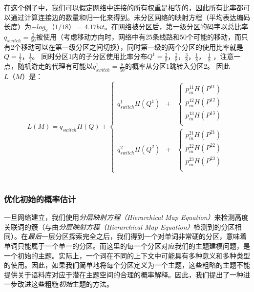在这个例子中，我们可以假定网络中连接的所有权重是相等的，因此所有比率都可以通过计算连接边的数量和归一化来得到。未分区网络的映射方程（平均表达编码长度）为$ - log_2（1/18）= 4.17 bit$。在网络被分区后，第一级分区的码字以总比率$ q_ {switch} = \frac {2} {50} $被使用（考虑移动方向时，网络中有25条线路和50个可能的移动，而只有2个移动可以在第一级分区之间切换），同时第一级的两个分区的使用比率就是$ Q = \frac {1} {2}，\frac {1} {2} $。 同时分区1内的子分区使用比率分布$ Q ^ 1 = \frac {2} {8}，\frac {2} {8}，\frac {3} {8}，\frac {1} {8} $， $ \frac {1} {8} $ ，注意一点，随机游走的代理有可能以$ q_ {switch} ^ 1 = \frac {8} {50} $的概率从分区1跳转入分区2。 因此$ L（M）$是：\\
\begin{equation}
L(M) = q_{switch}H(Q) + \left\{
\begin{aligned}
q_{switch}^1H(Q^1) & + & \left\{
\begin{aligned}
p_{in}^{11}H(P^{11}) \\
p_{in}^{12}H(P^{12}) \\
p_{in}^{13}H(P^{13}) \\
\end{aligned}
\right.\\
q_{switch}^2H(Q^2) & + & \left\{
\begin{aligned}
p_{in}^{21}H(P^{21}) \\
p_{in}^{22}H(P^{22}) \\
p_{in}^{23}H(P^{23}) \\
\end{aligned}
\right.
\end{aligned}
\right.
\end{equation}\\
\subsubsection{优化初始的概率估计}
一旦网络建立，我们使用\emph{分层映射方程（Hierarchical Map Equation）}来检测高度关联词的簇（与由\emph{分层映射方程（Hierarchical Map Equation）}检测到的分区相同）。在\emph{最后}一层分区探索完全之后，我们得到一个对单词非常硬的分区，意味着单词只能属于一个单一的分区。而这里的每一个分区对应我们的主题建模问题，是一个初始的主题。实际上，一个词在不同的上下文中可能具有多种意义和多种类型的使用。因此，如果我们简单地将每个分区定义为一个主题，这些粗略的主题不能提供关于语料库对应于潜在主题空间的合理的概率解释。因此，我们提出了一种进一步改进这些粗糙\emph{初始}主题的方法。

